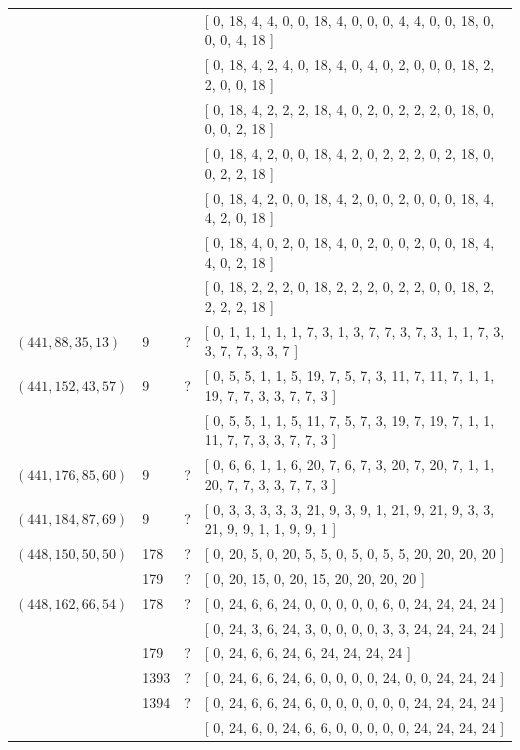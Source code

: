 \documentclass[12pt]{amsproc} %
\theoremstyle{definition}\newtheorem{defn}[thm]{Definition}
\theoremstyle{definition}\newtheorem{rem}[thm]{Remark}
\theoremstyle{definition}\newtheorem{ex}[thm]{Example}
\begin{document}
\begin{center}
\begin{longtable}{p{3.66cm}|P{0.8cm}|P{0.69cm}|p{10cm}}
		   &  &  & [ 0, 18, 4, 4, 0, 0, 18, 4, 0, 0, 0, 4, 4, 0, 0, 18, 0, 0, 0, 4, 18 ] \\
		   &  &  & [ 0, 18, 4, 2, 4, 0, 18, 4, 0, 4, 0, 2, 0, 0, 0, 18, 2, 2, 0, 0, 18 ] \\
		   &  &  & [ 0, 18, 4, 2, 2, 2, 18, 4, 0, 2, 0, 2, 2, 2, 0, 18, 0, 0, 0, 2, 18 ] \\
		   &  &  & [ 0, 18, 4, 2, 0, 0, 18, 4, 2, 0, 2, 2, 2, 0, 2, 18, 0, 0, 2, 2, 18 ] \\
		   &  &  & [ 0, 18, 4, 2, 0, 0, 18, 4, 2, 0, 0, 2, 0, 0, 0, 18, 4, 4, 2, 0, 18 ] \\
		   &  &  & [ 0, 18, 4, 0, 2, 0, 18, 4, 0, 2, 0, 0, 2, 0, 0, 18, 4, 4, 0, 2, 18 ] \\
		   &  &  & [ 0, 18, 2, 2, 2, 0, 18, 2, 2, 2, 0, 2, 2, 0, 0, 18, 2, 2, 2, 2, 18 ] \\
		\hline
		 $(441, 88, 35, 13)$  & 9 & ? & [ 0, 1, 1, 1, 1, 1, 7, 3, 1, 3, 7, 7, 3, 7, 3, 1, 1, 7, 3, 3, 7, 7, 3, 3, 7 ] \\
		\hline
		 $(441, 152, 43, 57)$  & 9 & ? & [ 0, 5, 5, 1, 1, 5, 19, 7, 5, 7, 3, 11, 7, 11, 7, 1, 1, 19, 7, 7, 3, 3, 7, 7, 3 ] \\
		   &  &  & [ 0, 5, 5, 1, 1, 5, 11, 7, 5, 7, 3, 19, 7, 19, 7, 1, 1, 11, 7, 7, 3, 3, 7, 7, 3 ] \\
		\hline
		 $(441, 176, 85, 60)$  & 9 & ? & [ 0, 6, 6, 1, 1, 6, 20, 7, 6, 7, 3, 20, 7, 20, 7, 1, 1, 20, 7, 7, 3, 3, 7, 7, 3 ] \\
		\hline
		 $(441, 184, 87, 69)$  & 9 & ? & [ 0, 3, 3, 3, 3, 3, 21, 9, 3, 9, 1, 21, 9, 21, 9, 3, 3, 21, 9, 9, 1, 1, 9, 9, 1 ] \\
		\hline
		 $(448, 150, 50, 50)$  & 178 & ? & [ 0, 20, 5, 0, 20, 5, 5, 0, 5, 0, 5, 5, 20, 20, 20, 20 ] \\
		   & 179 & ? & [ 0, 20, 15, 0, 20, 15, 20, 20, 20, 20 ] \\
		\hline
		 $(448, 162, 66, 54)$  & 178 & ? & [ 0, 24, 6, 6, 24, 0, 0, 0, 0, 0, 6, 0, 24, 24, 24, 24 ] \\
		   &  &  & [ 0, 24, 3, 6, 24, 3, 0, 0, 0, 0, 3, 3, 24, 24, 24, 24 ] \\
		   & 179 & ? & [ 0, 24, 6, 6, 24, 6, 24, 24, 24, 24 ] \\
		   & 1393 & ? & [ 0, 24, 6, 6, 24, 6, 0, 0, 0, 0, 24, 0, 0, 24, 24, 24 ] \\
		   & 1394 & ? & [ 0, 24, 6, 6, 24, 6, 0, 0, 0, 0, 0, 0, 24, 24, 24, 24 ] \\
		   &  &  & [ 0, 24, 6, 0, 24, 6, 6, 0, 0, 0, 0, 0, 24, 24, 24, 24 ] \\

\end{longtable}
\end{center}
\end{document}
